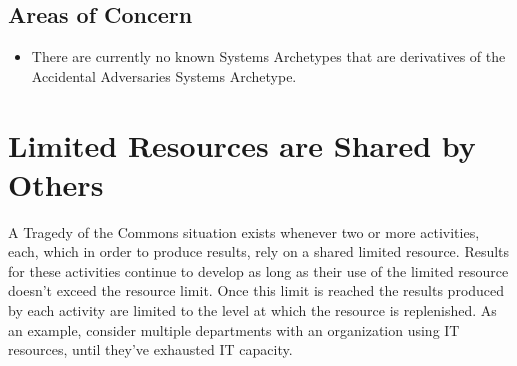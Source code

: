 \documentclass[]{memoir}
\begin{document}
\subsection{Areas of Concern}

\begin{itemize}
\itemsep1pt\parskip0pt
\item
  There are currently no known Systems Archetypes that are derivatives
  of the Accidental Adversaries Systems Archetype.
\end{itemize}

\section{Limited Resources are Shared by Others}

A Tragedy of the Commons situation exists whenever two or more
activities, each, which in order to produce results, rely on a shared
limited resource. Results for these activities continue to develop as
long as their use of the limited resource doesn't exceed the resource
limit. Once this limit is reached the results produced by each activity
are limited to the level at which the resource is replenished. As an
example, consider multiple departments with an organization using IT
resources, until they've exhausted IT capacity.

\FloatBarrier 
\end{document}
